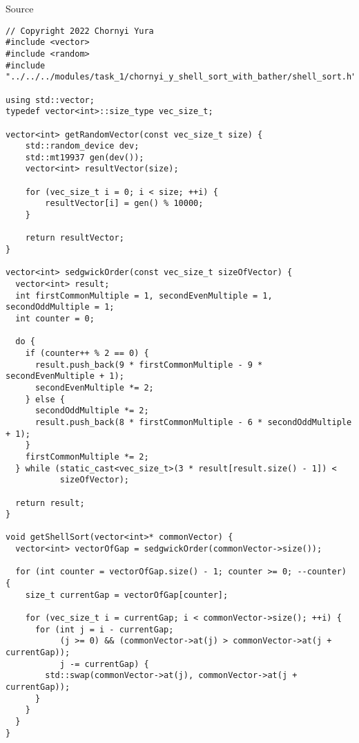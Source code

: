 \documentclass{report}
\begin{document}
\begin{center}
Source
\end{center}
\begin{lstlisting}
// Copyright 2022 Chornyi Yura
#include <vector>
#include <random>
#include "../../../modules/task_1/chornyi_y_shell_sort_with_bather/shell_sort.h"

using std::vector;
typedef vector<int>::size_type vec_size_t;

vector<int> getRandomVector(const vec_size_t size) {
    std::random_device dev;
    std::mt19937 gen(dev());
    vector<int> resultVector(size);

    for (vec_size_t i = 0; i < size; ++i) {
        resultVector[i] = gen() % 10000;
    }

    return resultVector;
}

vector<int> sedgwickOrder(const vec_size_t sizeOfVector) {
  vector<int> result;
  int firstCommonMultiple = 1, secondEvenMultiple = 1, secondOddMultiple = 1;
  int counter = 0;

  do {
    if (counter++ % 2 == 0) {
      result.push_back(9 * firstCommonMultiple - 9 * secondEvenMultiple + 1);
      secondEvenMultiple *= 2;
    } else {
      secondOddMultiple *= 2;
      result.push_back(8 * firstCommonMultiple - 6 * secondOddMultiple + 1);
    }
    firstCommonMultiple *= 2;
  } while (static_cast<vec_size_t>(3 * result[result.size() - 1]) <
           sizeOfVector);

  return result;
}

void getShellSort(vector<int>* commonVector) {
  vector<int> vectorOfGap = sedgwickOrder(commonVector->size());

  for (int counter = vectorOfGap.size() - 1; counter >= 0; --counter) {
    size_t currentGap = vectorOfGap[counter];

    for (vec_size_t i = currentGap; i < commonVector->size(); ++i) {
      for (int j = i - currentGap;
           (j >= 0) && (commonVector->at(j) > commonVector->at(j + currentGap));
           j -= currentGap) {
        std::swap(commonVector->at(j), commonVector->at(j + currentGap));
      }
    }
  }
}
\end{lstlisting}
\end{document}
